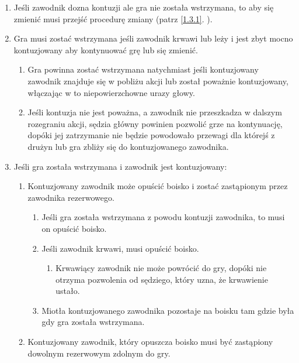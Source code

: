 \documentclass[11pt,a4paper]{article}
\renewcommand{\subsubsection}[1]{
  \oldsubsubsection{#1}%
  \label{\thesubsubsection}
}
\newcommand{\myref}[1]{\ref{#1}. \nameref{#1}}
\begin{document}
\subsubsection{Zmiana z powodu kontuzji}
\begin{enumerate}
  \item Jeśli zawodnik dozna kontuzji ale gra nie została wstrzymana, to aby się zmienić musi przejść procedurę zmiany (patrz \myref{1.3.1}).
  \item Gra musi zostać wstrzymana jeśli zawodnik krwawi lub leży i jest zbyt mocno kontuzjowany aby kontynuować grę lub się zmienić.
  \begin{enumerate}
    \item Gra powinna zostać wstrzymana natychmiast jeśli kontuzjowany zawodnik znajduje się w pobliżu akcji lub został poważnie kontuzjowany, włączając w to niepowierzchowne urazy głowy.
    \item Jeśli kontuzja nie jest poważna, a zawodnik nie przeszkadza w dalszym rozegraniu akcji, sędzia główny powinien pozwolić grze na kontynuację, dopóki jej zatrzymanie nie będzie powodowało przewagi dla którejś z drużyn lub gra zbliży się do kontuzjowanego zawodnika.
  \end{enumerate}
  \item Jeśli gra została wstrzymana i zawodnik jest kontuzjowany:
  \begin{enumerate}
    \item Kontuzjowany zawodnik może opuścić boisko i zostać zastąpionym przez zawodnika rezerwowego.
    \begin{enumerate}
      \item Jeśli gra została wstrzymana z powodu kontuzji zawodnika, to musi on opuścić boisko.
      \item Jeśli zawodnik krwawi, musi opuścić boisko.
      \begin{enumerate}
        \item Krwawiący zawodnik nie może powrócić do gry, dopóki nie otrzyma pozwolenia od sędziego, który uzna, że krwawienie ustało.
      \end{enumerate}
      \item Miotła kontuzjowanego zawodnika pozostaje na boisku tam gdzie była gdy gra została wstrzymana.
    \end{enumerate}
    \item Kontuzjowany zawodnik, który opuszcza boisko musi być zastąpiony dowolnym rezerwowym zdolnym do gry.
    \begin{enumerate}

\end{enumerate}
\end{enumerate}
\end{enumerate}
\end{document}

